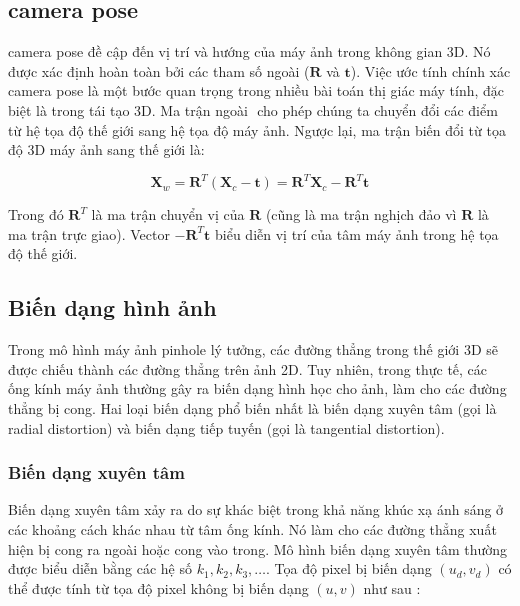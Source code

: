 \subsection{camera pose}

camera pose đề cập đến vị trí và hướng của máy ảnh trong không gian 3D. Nó được xác định hoàn toàn bởi các tham số ngoài ($\mathbf{R}$ và $\mathbf{t}$). Việc ước tính chính xác camera pose là một bước quan trọng trong nhiều bài toán thị giác máy tính, đặc biệt là trong tái tạo 3D. Ma trận ngoài $\mathbf{}$ cho phép chúng ta chuyển đổi các điểm từ hệ tọa độ thế giới sang hệ tọa độ máy ảnh. Ngược lại, ma trận biến đổi từ tọa độ 3D máy ảnh sang thế giới là:

\begin{equation} \label{eq:cam_to_world_vector}
\mathbf{X}_w = \mathbf{R}^T (\mathbf{X}_c - \mathbf{t}) = \mathbf{R}^T \mathbf{X}_c - \mathbf{R}^T \mathbf{t}
\end{equation}

Trong đó $\mathbf{R}^T$ là ma trận chuyển vị của $\mathbf{R}$ (cũng là ma trận nghịch đảo vì $\mathbf{R}$ là ma trận trực giao). Vector $-\mathbf{R}^T \mathbf{t}$ biểu diễn vị trí của tâm máy ảnh trong hệ tọa độ thế giới.

\subsection{Biến dạng hình ảnh}

Trong mô hình máy ảnh pinhole lý tưởng, các đường thẳng trong thế giới 3D sẽ được chiếu thành các đường thẳng trên ảnh 2D. Tuy nhiên, trong thực tế, các ống kính máy ảnh thường gây ra biến dạng hình học cho ảnh, làm cho các đường thẳng bị cong. Hai loại biến dạng phổ biến nhất là biến dạng xuyên tâm (gọi là radial distortion) và biến dạng tiếp tuyến (gọi là tangential distortion).

\subsubsection{Biến dạng xuyên tâm}

Biến dạng xuyên tâm xảy ra do sự khác biệt trong khả năng khúc xạ ánh sáng ở các khoảng cách khác nhau từ tâm ống kính. Nó làm cho các đường thẳng xuất hiện bị cong ra ngoài hoặc cong vào trong. Mô hình biến dạng xuyên tâm thường được biểu diễn bằng các hệ số $k_1, k_2, k_3, \dots$. Tọa độ pixel bị biến dạng $(u_d, v_d)$ có thể được tính từ tọa độ pixel không bị biến dạng $(u, v)$ như sau :

